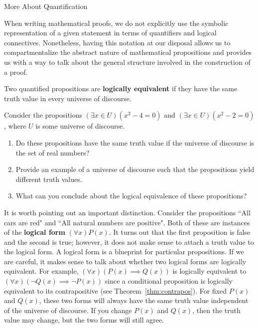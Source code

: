 \begin{section}{More About Quantification}\label{sec:More_About_Quantification}

When writing mathematical proofs, we do not explicitly use the symbolic representation of a given statement in terms of quantifiers and logical connectives.  Nonetheless, having this notation at our disposal allows us to compartmentalize the abstract nature of mathematical propositions and provides us with a way to talk about the general structure involved in the construction of a proof.

\begin{definition}
Two quantified propositions are \textbf{logically equivalent} if they have the same truth value in every universe of discourse.
\end{definition}

\begin{problem}
Consider the propositions $(\exists x\in U)(x^2-4=0)$ and $(\exists x\in U)(x^2-2=0)$, where $U$ is some universe of discourse.  
\begin{enumerate}[label=\textrm{(\alph*)}]
\item Do these propositions have the same truth value if the universe of discourse is the set of real numbers?
\item Provide an example of a universe of discourse such that the propositions yield different truth values.  
\item What can you conclude about the logical equivalence of these propositions?
\end{enumerate}
\end{problem}

It is worth pointing out an important distinction.  Consider the propositions ``All cars are red" and ``All natural numbers are positive".  Both of these are instances of the \textbf{logical form} $(\forall x)P(x)$.  It turns out that the first proposition is false and the second is true; however, it does not make sense to attach a truth value to the logical form.  A logical form is a blueprint for particular propositions.  If we are careful, it makes sense to talk about whether two logical forms are logically equivalent.  For example, $(\forall x)(P(x)\implies Q(x))$ is logically equivalent to $(\forall x)(\neg Q(x)\implies \neg P(x))$ since a conditional proposition is logically equivalent to its contrapositive (see Theorem~\ref{thm:contrapos}).  For fixed $P(x)$ and $Q(x)$, these two forms will always have the same truth value independent of the universe of discourse.  If you change $P(x)$ and $Q(x)$, then the truth value may change, but the two forms will still agree.


\end{section}
